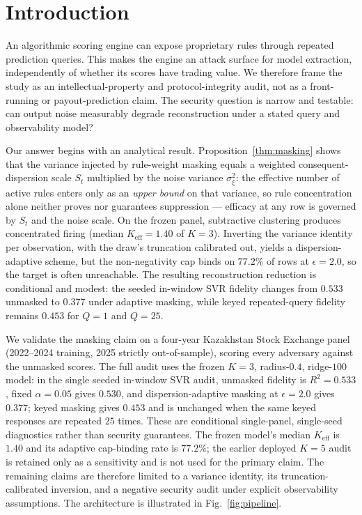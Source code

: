 \documentclass[pdflatex,sn-mathphys-num]{sn-jnl}
\theoremstyle{thmstyleone}
\theoremstyle{thmstyletwo}
\theoremstyle{thmstylethree}
\begin{document}
\maketitle

\section{Introduction}\label{sec1}

An algorithmic scoring engine can expose proprietary rules through repeated prediction queries. This makes the engine an attack surface for model extraction, independently of whether its scores have trading value. We therefore frame the study as an intellectual-property and protocol-integrity audit, not as a front-running or payout-prediction claim. The security question is narrow and testable: can output noise measurably degrade reconstruction under a stated query and observability model?

Our answer begins with an analytical result. Proposition~\ref{thm:masking} shows that the variance injected by rule-weight masking equals a weighted consequent-dispersion scale $S_t$ multiplied by the noise variance $\sigma_\xi^2$: the effective number of active rules enters only as an \emph{upper bound} on that variance, so rule concentration alone neither proves nor guarantees suppression --- efficacy at any row is governed by $S_t$ and the noise scale. On the frozen panel, subtractive clustering produces concentrated firing (median $K_{\mathrm{eff}} = 1.40$ of $K = 3$). Inverting the variance identity per observation, with the draw's truncation calibrated out, yields a dispersion-adaptive scheme, but the non-negativity cap binds on $77.2\%$ of rows at $\epsilon=2.0$, so the target is often unreachable. The resulting reconstruction reduction is conditional and modest: the seeded in-window SVR fidelity changes from $0.533$ unmasked to $0.377$ under adaptive masking, while keyed repeated-query fidelity remains $0.453$ for $Q=1$ and $Q=25$.

We validate the masking claim on a four-year Kazakhstan Stock Exchange panel (2022--2024 training, 2025 strictly out-of-sample), scoring every adversary against the unmasked scores. The full audit uses the frozen $K=3$, radius-$0.4$, ridge-$100$ model: in the single seeded in-window SVR audit, unmasked fidelity is $R^2=0.533$, fixed $\alpha=0.05$ gives $0.530$, and dispersion-adaptive masking at $\epsilon=2.0$ gives $0.377$; keyed masking gives $0.453$ and is unchanged when the same keyed responses are repeated $25$ times. These are conditional single-panel, single-seed diagnostics rather than security guarantees. The frozen model's median $K_{\mathrm{eff}}$ is $1.40$ and its adaptive cap-binding rate is $77.2\%$; the earlier deployed $K=5$ audit is retained only as a sensitivity and is not used for the primary claim. The remaining claims are therefore limited to a variance identity, its truncation-calibrated inversion, and a negative security audit under explicit observability assumptions. The architecture is illustrated in Fig.~\ref{fig:pipeline}.
\end{document}
